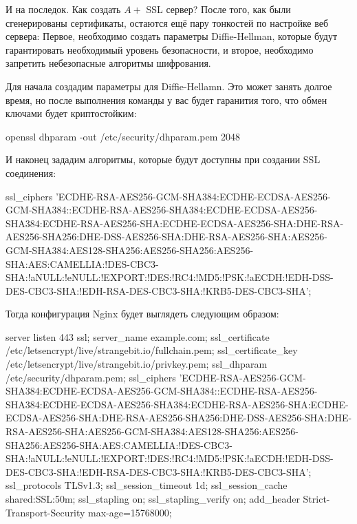 И на последок. Как создать $A+$ SSL сервер? После того, как были сгенерированы
сертификаты, остаются ещё пару тонкостей по настройке веб сервера: Первое, необходимо
создать параметры Diffie-Hellman, которые будут гарантировать необходимый уровень
безопасности, и второе, необходимо запретить небезопасные алгоритмы шифрования.

Для начала создадим параметры для Diffie-Hellamn. Это может занять долгое время, но
после выполнения команды у вас будет гаранития того, что обмен ключами будет 
криптостойким:

\begin{python}
openssl dhparam -out /etc/security/dhparam.pem 2048
\end{python}

И наконец зададим алгоритмы, которые будут доступны при создании SSL соединения:

\begin{python}
    ssl_ciphers 'ECDHE-RSA-AES256-GCM-SHA384:ECDHE-ECDSA-AES256-GCM-SHA384::ECDHE-RSA-AES256-SHA384:ECDHE-ECDSA-AES256-SHA384:ECDHE-RSA-AES256-SHA:ECDHE-ECDSA-AES256-SHA:DHE-RSA-AES256-SHA256:DHE-DSS-AES256-SHA:DHE-RSA-AES256-SHA:AES256-GCM-SHA384:AES128-SHA256:AES256-SHA256:AES256-SHA:AES:CAMELLIA:!DES-CBC3-SHA:!aNULL:!eNULL:!EXPORT:!DES:!RC4:!MD5:!PSK:!aECDH:!EDH-DSS-DES-CBC3-SHA:!EDH-RSA-DES-CBC3-SHA:!KRB5-DES-CBC3-SHA';
\end{python}

Тогда конфигурация Nginx будет выглядеть следующим образом:

\begin{python}
server {
    listen 443 ssl;
    server_name example.com;
    ssl_certificate /etc/letsencrypt/live/strangebit.io/fullchain.pem;
    ssl_certificate_key /etc/letsencrypt/live/strangebit.io/privkey.pem;
    ssl_dhparam /etc/security/dhparam.pem;
    ssl_ciphers 'ECDHE-RSA-AES256-GCM-SHA384:ECDHE-ECDSA-AES256-GCM-SHA384::ECDHE-RSA-AES256-SHA384:ECDHE-ECDSA-AES256-SHA384:ECDHE-RSA-AES256-SHA:ECDHE-ECDSA-AES256-SHA:DHE-RSA-AES256-SHA256:DHE-DSS-AES256-SHA:DHE-RSA-AES256-SHA:AES256-GCM-SHA384:AES128-SHA256:AES256-SHA256:AES256-SHA:AES:CAMELLIA:!DES-CBC3-SHA:!aNULL:!eNULL:!EXPORT:!DES:!RC4:!MD5:!PSK:!aECDH:!EDH-DSS-DES-CBC3-SHA:!EDH-RSA-DES-CBC3-SHA:!KRB5-DES-CBC3-SHA';
    ssl_protocols TLSv1.3;
    ssl_session_timeout 1d;
    ssl_session_cache shared:SSL:50m;
    ssl_stapling on;
    ssl_stapling_verify on;
    add_header Strict-Transport-Security max-age=15768000;
}
\end{python}

